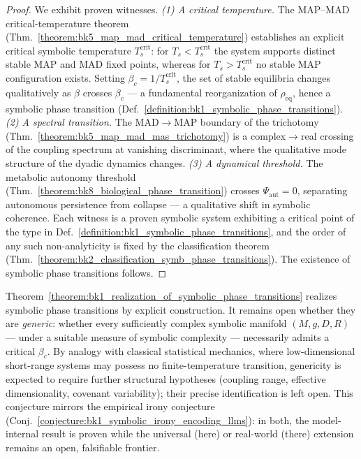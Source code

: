 \begin{proof}
\label{proof:bk1_realization_of_symbolic_phase_transitions}
\leavevmode
We exhibit proven witnesses. \emph{(1) A critical temperature.} The MAP--MAD critical-temperature theorem (Thm.~\ref{theorem:bk5_map_mad_critical_temperature}) establishes an explicit critical symbolic temperature $T_s^{\text{crit}}$: for $T_s < T_s^{\text{crit}}$ the system supports distinct stable MAP and MAD fixed points, whereas for $T_s > T_s^{\text{crit}}$ no stable MAP configuration exists. Setting $\beta_c = 1/T_s^{\text{crit}}$, the set of stable equilibria changes qualitatively as $\beta$ crosses $\beta_c$ --- a fundamental reorganization of $\rho_{\text{eq}}$, hence a symbolic phase transition (Def.~\ref{definition:bk1_symbolic_phase_transitions}). \emph{(2) A spectral transition.} The MAD$\to$MAP boundary of the trichotomy (Thm.~\ref{theorem:bk5_map_mad_mas_trichotomy}) is a complex$\to$real crossing of the coupling spectrum at vanishing discriminant, where the qualitative mode structure of the dyadic dynamics changes. \emph{(3) A dynamical threshold.} The metabolic autonomy threshold (Thm.~\ref{theorem:bk8_biological_phase_transition}) crosses $\Psi_{\mathrm{aut}} = 0$, separating autonomous persistence from collapse --- a qualitative shift in symbolic coherence. Each witness is a proven symbolic system exhibiting a critical point of the type in Def.~\ref{definition:bk1_symbolic_phase_transitions}, and the order of any such non-analyticity is fixed by the classification theorem (Thm.~\ref{theorem:bk2_classification_symb_phase_transitions}). The existence of symbolic phase transitions follows.
\end{proof}
\begin{conjecture}
\label{conjecture:bk1_genericity_of_symbolic_phase_transitions}
Theorem~\ref{theorem:bk1_realization_of_symbolic_phase_transitions} realizes symbolic phase transitions by explicit construction. It remains open whether they are \emph{generic}: whether every sufficiently complex symbolic manifold $(M, g, D, R)$ --- under a suitable measure of symbolic complexity --- necessarily admits a critical $\beta_c$. By analogy with classical statistical mechanics, where low-dimensional short-range systems may possess no finite-temperature transition, genericity is expected to require further structural hypotheses (coupling range, effective dimensionality, covenant variability); their precise identification is left open. This conjecture mirrors the empirical irony conjecture (Conj.~\ref{conjecture:bk1_symbolic_irony_encoding_llms}): in both, the model-internal result is proven while the universal (here) or real-world (there) extension remains an open, falsifiable frontier.
\end{conjecture}

